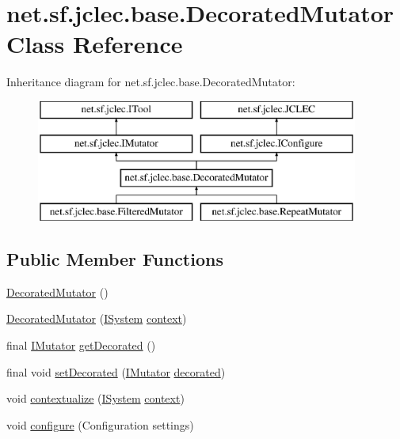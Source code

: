 \hypertarget{classnet_1_1sf_1_1jclec_1_1base_1_1_decorated_mutator}{\section{net.\-sf.\-jclec.\-base.\-Decorated\-Mutator Class Reference}
\label{classnet_1_1sf_1_1jclec_1_1base_1_1_decorated_mutator}
}
Inheritance diagram for net.\-sf.\-jclec.\-base.\-Decorated\-Mutator\-:\begin{figure}[H]
\begin{center}
\leavevmode
\includegraphics[height=4.000000cm]{classnet_1_1sf_1_1jclec_1_1base_1_1_decorated_mutator}
\end{center}
\end{figure}
\subsection*{Public Member Functions}
\begin{DoxyCompactItemize}
\item 
\hyperlink{classnet_1_1sf_1_1jclec_1_1base_1_1_decorated_mutator_a6091a9e583a04f96f98b5810e20a49ab}{Decorated\-Mutator} ()
\item 
\hyperlink{classnet_1_1sf_1_1jclec_1_1base_1_1_decorated_mutator_a766220134e18586517674ea963ff615e}{Decorated\-Mutator} (\hyperlink{interfacenet_1_1sf_1_1jclec_1_1_i_system}{I\-System} \hyperlink{classnet_1_1sf_1_1jclec_1_1base_1_1_decorated_mutator_a0f500ae1072a9663fa96475891c074bc}{context})
\item 
final \hyperlink{interfacenet_1_1sf_1_1jclec_1_1_i_mutator}{I\-Mutator} \hyperlink{classnet_1_1sf_1_1jclec_1_1base_1_1_decorated_mutator_a36fe66cf5bbef0c2bbdfcda114b99114}{get\-Decorated} ()
\item 
final void \hyperlink{classnet_1_1sf_1_1jclec_1_1base_1_1_decorated_mutator_ab6a4ff6195fe23e50bb296b0452aa8ba}{set\-Decorated} (\hyperlink{interfacenet_1_1sf_1_1jclec_1_1_i_mutator}{I\-Mutator} \hyperlink{classnet_1_1sf_1_1jclec_1_1base_1_1_decorated_mutator_a3eb423e738412ac288f0b37381e685f2}{decorated})
\item 
void \hyperlink{classnet_1_1sf_1_1jclec_1_1base_1_1_decorated_mutator_afa0585c251b1363b8064956f5d2d6d25}{contextualize} (\hyperlink{interfacenet_1_1sf_1_1jclec_1_1_i_system}{I\-System} \hyperlink{classnet_1_1sf_1_1jclec_1_1base_1_1_decorated_mutator_a0f500ae1072a9663fa96475891c074bc}{context})
\item 
void \hyperlink{classnet_1_1sf_1_1jclec_1_1base_1_1_decorated_mutator_ab8d9f3e1c6ac1dc1850adbdc7f979c60}{configure} (Configuration settings)
\end{DoxyCompactItemize}
